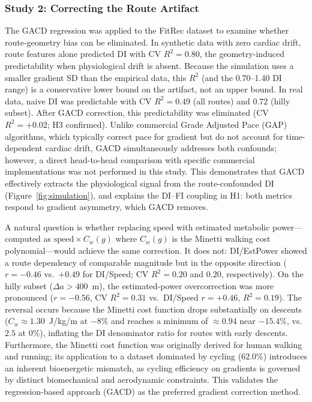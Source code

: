 \documentclass[times, twoside]{zHenriquesLab-StyleBioRxiv}
\begin{document}
\subsubsection*{Study 2: Correcting the Route Artifact}
The GACD regression was applied to the FitRec dataset to examine whether route-geometry bias can be eliminated. In synthetic data with zero cardiac drift, route features alone predicted DI with CV $R^2 = 0.80$, the geometry-induced predictability when physiological drift is absent. Because the simulation uses a smaller gradient SD than the empirical data, this $R^2$ (and the 0.70--1.40 DI range) is a conservative lower bound on the artifact, not an upper bound. In real data, naive DI was predictable with CV $R^2 = 0.49$ (all routes) and $0.72$ (hilly subset). After GACD correction, this predictability was eliminated (CV $R^2 = +0.02$; H3 confirmed). Unlike commercial Grade Adjusted Pace (GAP) algorithms, which typically correct pace for gradient but do not account for time-dependent cardiac drift, GACD simultaneously addresses both confounds; however, a direct head-to-head comparison with specific commercial implementations was not performed in this study.
This demonstrates that GACD effectively extracts the physiological signal from the route-confounded DI (Figure~\ref{fig:simulation}), and explains the DI--FI coupling in H1: both metrics respond to gradient asymmetry, which GACD removes.

A natural question is whether replacing speed with estimated metabolic power---computed as $\text{speed} \times C_w(g)$ where $C_w(g)$ is the Minetti \cite{minetti2002} walking cost polynomial---would achieve the same correction. It does not: DI/EstPower showed a route dependency of comparable magnitude but in the opposite direction ($r = -0.46$ vs.\ $+0.49$ for DI/Speed; CV $R^2 = 0.20$ and $0.20$, respectively). On the hilly subset ($\Delta a > 400$~m), the estimated-power overcorrection was more pronounced ($r = -0.56$, CV $R^2 = 0.31$ vs.\ DI/Speed $r = +0.46$, $R^2 = 0.19$). The reversal occurs because the Minetti cost function drops substantially on descents ($C_w \approx 1.30$~J/kg/m at $-8\%$ and reaches a minimum of $\approx 0.94$ near $-15.4\%$, vs.\ $2.5$ at $0\%$), inflating the DI denominator ratio for routes with early descents. Furthermore, the Minetti cost function was originally derived for human walking and running; its application to a dataset dominated by cycling (62.0\%) introduces an inherent bioenergetic mismatch, as cycling efficiency on gradients is governed by distinct biomechanical and aerodynamic constraints. This validates the regression-based approach (GACD) as the preferred gradient correction method.
\end{document}
